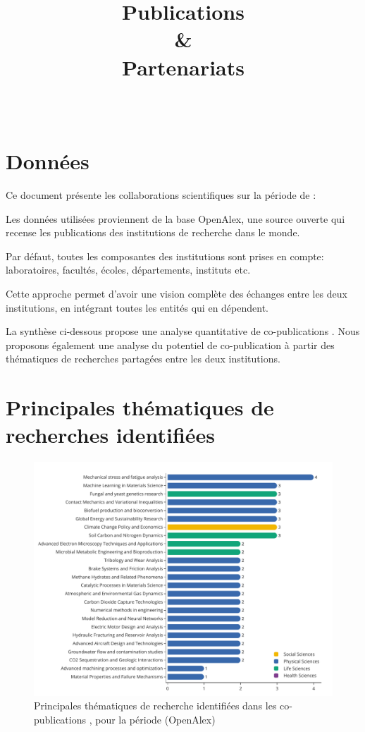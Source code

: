 \documentclass[french, 11pt]{dibiso/pubpart}
\title{Publications \\ \& \\ Partenariats}
\date{\reportyear}
\subtitle{\textbf{\entitiesacronym} \\
  \medskip
  \entitiesfullname
}
\begin{document}
\renewcommand{\arraystretch}{2}


\maketitle

\tableofcontents

\pagebreak



\section{Données}

Ce document présente les collaborations scientifiques sur la période \reportyear de : \entitiesfullname

Les données utilisées proviennent de la base OpenAlex, une source ouverte qui recense les publications des institutions de recherche dans le monde.

Par défaut, toutes les composantes des institutions sont prises en compte: laboratoires, facultés, écoles, départements, instituts etc.

Cette approche permet d'avoir une vision complète des échanges entre les deux institutions, en intégrant toutes les entités qui en dépendent. 

La synthèse ci-dessous propose une analyse quantitative de co-publications \entitiesfullname. 
Nous proposons également une analyse du potentiel de co-publication à partir des thématiques de recherches partagées entre les deux institutions.

\pagebreak

\section{Principales thématiques de recherches identifiées}


\begin{figure}[!h]
  \includegraphics[width=\textwidth]{figures/topics_collaborations.pdf}
  \centering
  \caption{Principales thématiques de recherche identifiées dans les co-publications \entitiesacronym , pour la période \reportyear (OpenAlex)}
  \label{fig_topics_collaborations}
\end{figure}
\end{document}
